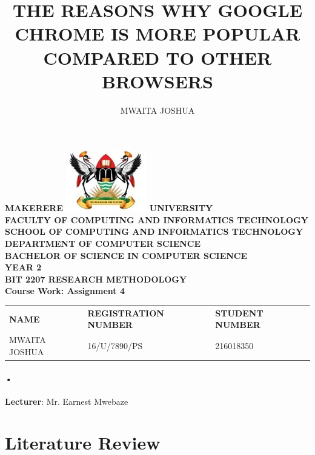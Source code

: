 \documentclass[7pt]{article}
\begin{document}
\begin{Huge}
\begin{center}
\begin{normalsize}
\textbf{MAKERERE \includegraphics[scale=0.5]{logo} UNIVERSITY }\\

\textbf{FACULTY OF COMPUTING AND INFORMATICS TECHNOLOGY} \\
\textbf{SCHOOL OF COMPUTING AND INFORMATICS TECHNOLOGY} \\
\textbf{DEPARTMENT OF COMPUTER SCIENCE} \\
\textbf{BACHELOR OF SCIENCE IN COMPUTER SCIENCE} \\
\textbf{YEAR 2} \\
\textbf{BIT 2207 RESEARCH METHODOLOGY} \\
\textbf{Course Work: Assignment 4}\\
\end{normalsize}
\end{center}
\end{Huge}

\begin{center}
\begin{tabular}{l l l}
\textbf{NAME}  & \textbf{REGISTRATION NUMBER} & \textbf{STUDENT NUMBER} \\
MWAITA JOSHUA & 16/U/7890/PS & 216018350 \\
\end{tabular}

\paragraph{•}
\textbf{Lecturer}: Mr. Earnest Mwebaze
\end{center}

\newpage

\title{THE REASONS WHY GOOGLE CHROME IS MORE POPULAR COMPARED TO OTHER BROWSERS}
\author{MWAITA JOSHUA}      
\renewcommand{\today}{}

\maketitle

\section*{Literature Review}
\end{document}
